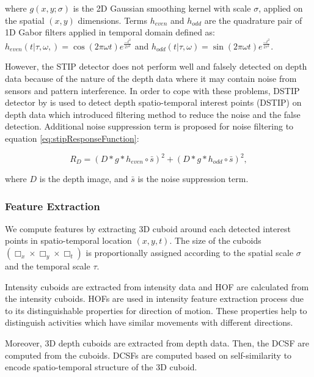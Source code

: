 \documentclass[a4paper, 10pt, conference]{ieeeconf}      %
\begin{document}
	where $g(x, y; \sigma)$ is the 2D Gaussian smoothing kernel with scale $\sigma$, applied on the spatial $\left(x, y\right)$ dimensions. Terms $h_{even}$ and $h_{odd}$ are the quadrature pair of 1D Gabor filters applied in temporal domain defined as: $h_{even}\left(t|\tau,\omega,\right)=\cos\left(2\pi\omega t\right)e^{\frac{-t^{2}}{2\tau^{2}}}$ and $h_{odd}\left(t|\tau,\omega\right)=\sin\left(2\pi\omega t\right)e^{\frac{-t^{2}}{2\tau^{2}}}$.
    
    However, the STIP detector does not perform well and falsely detected on depth data because of the nature of the depth data where it may contain noise from sensors and pattern interference. In order to cope with these problems, DSTIP detector by \cite{c9} is used to detect depth spatio-temporal interest points (DSTIP) on depth data which introduced filtering method to reduce the noise and the false detection. Additional noise suppression term is proposed for noise filtering to equation \ref{eq:stipResponseFunction}:

\begin{equation}
R_{D} = \left(D * g * h_{even}\circ\bar{s}\right)^{2}+\left(D * g * h_{odd}\circ\bar{s}\right)^{2},
\label{eq:dstipResponseFunction}
\end{equation}

where $D$ is the depth image, and $\bar{s}$ is the noise suppression term.


\subsubsection{Feature Extraction}
\label{section:FeatureExtraction}
We compute features by extracting 3D cuboid around each detected interest points in spatio-temporal location $\left(x, y, t\right)$. The size of the cuboids $\left(\Box_{x}\times\Box_{y}\times\Box_{t}\right)$ is proportionally assigned according to the spatial scale $\sigma$ and the temporal scale $\tau$.

Intensity cuboids are extracted from intensity data and HOF are calculated from the intensity cuboids. HOFs are used in intensity feature extraction process due to its distinguishable properties for direction of motion. These properties help to distinguish activities which have similar movements with different directions.

Moreover, 3D depth cuboids are extracted from depth data. Then, the DCSF \cite{c9} are computed from the cuboids. DCSFs are computed based on self-similarity to encode spatio-temporal structure of the 3D cuboid. %
\end{document}
